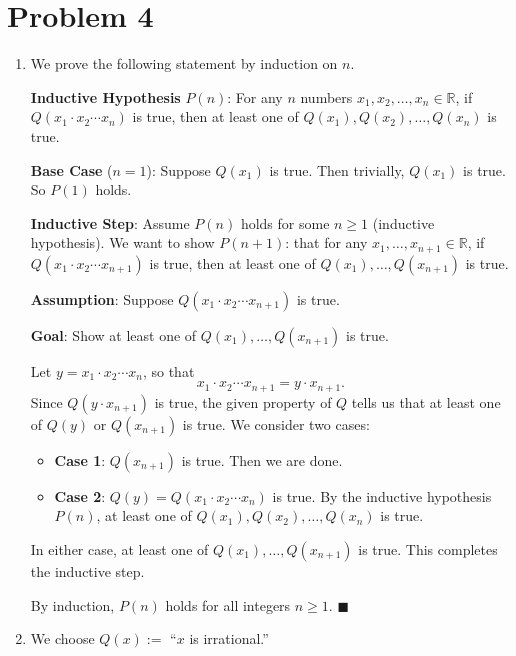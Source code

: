 \documentclass[11pt]{article}
\begin{document}
\newpage

\section*{Problem 4}

\begin{enumerate}[label=\textbf{(\alph*)}]

\item We prove the following statement by induction on $n$.

\textbf{Inductive Hypothesis} $P(n)$: For any $n$ numbers $x_1, x_2, \ldots, x_n \in \mathbb{R}$, if $Q(x_1 \cdot x_2 \cdots x_n)$ is true, then at least one of $Q(x_1), Q(x_2), \ldots, Q(x_n)$ is true.

\textbf{Base Case} ($n = 1$): Suppose $Q(x_1)$ is true. Then trivially, $Q(x_1)$ is true. So $P(1)$ holds.

\textbf{Inductive Step}: Assume $P(n)$ holds for some $n \geq 1$ (inductive hypothesis). We want to show $P(n+1)$: that for any $x_1, \ldots, x_{n+1} \in \mathbb{R}$, if $Q(x_1 \cdot x_2 \cdots x_{n+1})$ is true, then at least one of $Q(x_1), \ldots, Q(x_{n+1})$ is true.

\textbf{Assumption}: Suppose $Q(x_1 \cdot x_2 \cdots x_{n+1})$ is true.

\textbf{Goal}: Show at least one of $Q(x_1), \ldots, Q(x_{n+1})$ is true.

Let $y = x_1 \cdot x_2 \cdots x_n$, so that
\[
    x_1 \cdot x_2 \cdots x_{n+1} = y \cdot x_{n+1}.
\]
Since $Q(y \cdot x_{n+1})$ is true, the given property of $Q$ tells us that at least one of $Q(y)$ or $Q(x_{n+1})$ is true. We consider two cases:

\begin{itemize}
    \item \textbf{Case 1}: $Q(x_{n+1})$ is true. Then we are done.
    \item \textbf{Case 2}: $Q(y) = Q(x_1 \cdot x_2 \cdots x_n)$ is true. By the inductive hypothesis $P(n)$, at least one of $Q(x_1), Q(x_2), \ldots, Q(x_n)$ is true.
\end{itemize}

In either case, at least one of $Q(x_1), \ldots, Q(x_{n+1})$ is true. This completes the inductive step.

By induction, $P(n)$ holds for all integers $n \geq 1$. $\blacksquare$

\item We choose $Q(x) :=$ ``$x$ is irrational.''


\end{enumerate}
\end{document}
